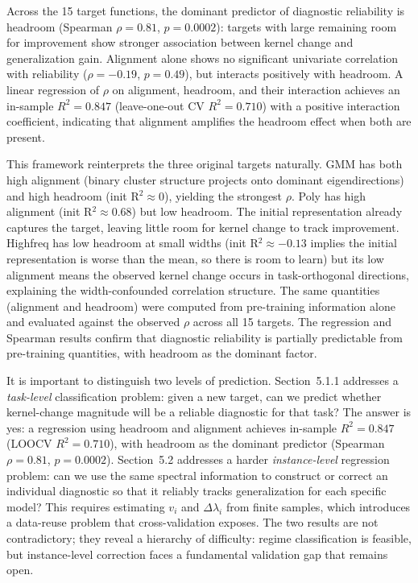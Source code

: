 \documentclass[twoside,11pt]{article}
\begin{document}
Across the 15 target functions, the dominant predictor of diagnostic reliability is headroom (Spearman $\rho=0.81$, $p=0.0002$): targets with large remaining room for improvement show stronger association between kernel change and generalization gain. Alignment alone shows no significant univariate correlation with reliability ($\rho=-0.19$, $p=0.49$), but interacts positively with headroom. A linear regression of $\rho$ on alignment, headroom, and their interaction achieves an in-sample $R^2=0.847$ (leave-one-out CV $R^2=0.710$) with a positive interaction coefficient, indicating that alignment amplifies the headroom effect when both are present.

This framework reinterprets the three original targets naturally. GMM has both high alignment (binary cluster structure projects onto dominant eigendirections) and high headroom (init R$^2\approx0$), yielding the strongest $\rho$. Poly has high alignment (init R$^2\approx0.68$) but low headroom. The initial representation already captures the target, leaving little room for kernel change to track improvement. Highfreq has low headroom at small widths (init R$^2\approx-0.13$ implies the initial representation is worse than the mean, so there is room to learn) but its low alignment means the observed kernel change occurs in task-orthogonal directions, explaining the width-confounded correlation structure. The same quantities (alignment and headroom) were computed from pre-training information alone and evaluated against the observed $\rho$ across all 15 targets. The regression and Spearman results confirm that diagnostic reliability is partially predictable from pre-training quantities, with headroom as the dominant factor.

It is important to distinguish two levels of prediction. Section~5.1.1 addresses a \emph{task-level} classification problem: given a new target, can we predict whether kernel-change magnitude will be a reliable diagnostic for that task? The answer is yes: a regression using headroom and alignment achieves in-sample $R^2=0.847$ (LOOCV $R^2=0.710$), with headroom as the dominant predictor (Spearman $\rho=0.81$, $p=0.0002$). Section~5.2 addresses a harder \emph{instance-level} regression problem: can we use the same spectral information to construct or correct an individual diagnostic so that it reliably tracks generalization for each specific model? This requires estimating $v_i$ and $\Delta\lambda_i$ from finite samples, which introduces a data-reuse problem that cross-validation exposes. The two results are not contradictory; they reveal a hierarchy of difficulty: regime classification is feasible, but instance-level correction faces a fundamental validation gap that remains open.
\end{document}
